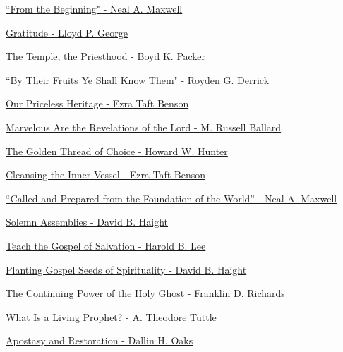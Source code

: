 \href{https://www.lds.org/general-conference/1993/10/from-the-beginning?lang=eng}{``From the Beginning" - Neal A. Maxwell}

\href{https://www.lds.org/general-conference/1994/04/gratitude?lang=eng}{Gratitude - Lloyd P. George}

\href{https://www.lds.org/general-conference/1993/04/the-temple-the-priesthood?lang=eng}{ The Temple, the Priesthood - Boyd K. Packer }

\href{https://www.lds.org/general-conference/1984/10/by-their-fruits-ye-shall-know-them?lang=eng}{``By Their Fruits Ye Shall Know Them" - Royden G. Derrick}

\href{https://www.lds.org/general-conference/1976/10/our-priceless-heritage?lang=eng}{Our Priceless Heritage - Ezra Taft Benson}

\href{https://www.lds.org/general-conference/1998/04/marvelous-are-the-revelations-of-the-lord?lang=eng}{Marvelous Are the Revelations of the Lord - M. Russell Ballard}

\href{https://www.lds.org/general-conference/1989/10/the-golden-thread-of-choice?lang=eng}{The Golden Thread of Choice - Howard W. Hunter}

\href{https://www.lds.org/general-conference/1986/04/cleansing-the-inner-vessel?lang=eng}{Cleansing the Inner Vessel - Ezra Taft Benson}

\href{https://www.lds.org/general-conference/1986/04/called-and-prepared-from-the-foundation-of-the-world?lang=eng}{“Called and Prepared from the Foundation of the World” - Neal A. Maxwell}

\href{https://www.lds.org/general-conference/1994/10/solemn-assemblies.html?lang=eng}{Solemn Assemblies - David B. Haight}

\href{https://www.lds.org/general-conference/1972/10/teach-the-gospel-of-salvation?lang=eng}{Teach the Gospel of Salvation - Harold B. Lee}

\href{https://www.lds.org/general-conference/1972/10/planting-gospel-seeds-of-spirituality?lang=eng}{Planting Gospel Seeds of Spirituality - David B. Haight}

\href{https://www.lds.org/general-conference/1973/04/the-continuing-power-of-the-holy-ghost?lang=eng}{The Continuing Power of the Holy Ghost - Franklin D. Richards}

\href{https://www.lds.org/general-conference/1973/04/what-is-a-living-prophet?lang=eng}{What Is a Living Prophet? - A. Theodore Tuttle}

\href{https://www.lds.org/general-conference/1995/04/apostasy-and-restoration?lang=eng}{Apostasy and Restoration - Dallin H. Oaks}

